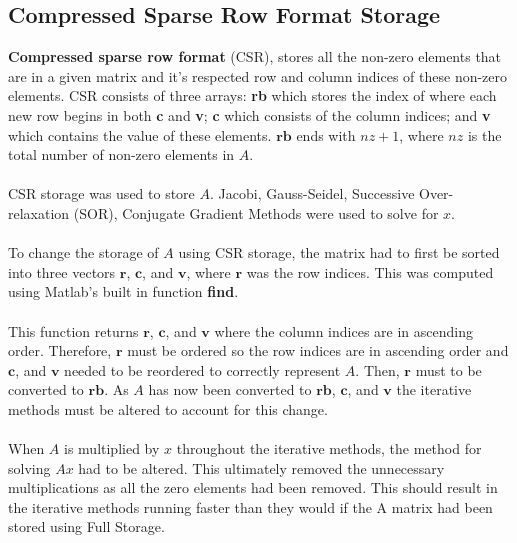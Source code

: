 \documentclass[12pt,a4paper]{article}
\begin{document}
\subsection{Compressed Sparse Row Format Storage}
\textbf{Compressed sparse row format} (CSR), stores all the non-zero elements that are in a given matrix and it's respected row and column indices of these non-zero elements. CSR consists of three arrays: \textbf{rb} which stores the index of where each new row begins in both \textbf{c} and \textbf{v}; \textbf{c} which consists of the column indices; and \textbf{v} which contains the value of these elements. $\textbf{rb}$ ends with $nz + 1$, where $nz$ is the total number of non-zero elements in $A$.
\\\\
CSR storage was used to store $A$. Jacobi, Gauss-Seidel, Successive Over-relaxation (SOR), Conjugate Gradient Methods were used to solve for $x$.
\\\\
To change the storage of $A$ using CSR storage, the matrix had to first be sorted into three vectors $\textbf{r}$, $\textbf{c}$, and $\textbf{v}$, where $\textbf{r}$ was the row indices. This was computed using Matlab's built in function \textbf{find}.
\\\\
This function returns $\textbf{r}$, $\textbf{c}$, and $\textbf{v}$ where the column indices are in ascending order. Therefore, $\textbf{r}$ must be ordered so the row indices are in ascending order and $\textbf{c}$, and $\textbf{v}$ needed to be reordered to correctly represent $A$. Then, $\textbf{r}$ must to be converted to $\textbf{rb}$. As $A$ has now been converted to $\textbf{rb}$, $\textbf{c}$, and $\textbf{v}$ the iterative methods must be altered to account for this change. 
\\\\
When $A$ is multiplied by $x$ throughout the iterative methods, the method for solving $Ax$ had to be altered. This ultimately removed the unnecessary multiplications as all the zero elements had been removed. This should result in the iterative methods running faster than they would if the A matrix had been stored using Full Storage.
\end{document}
